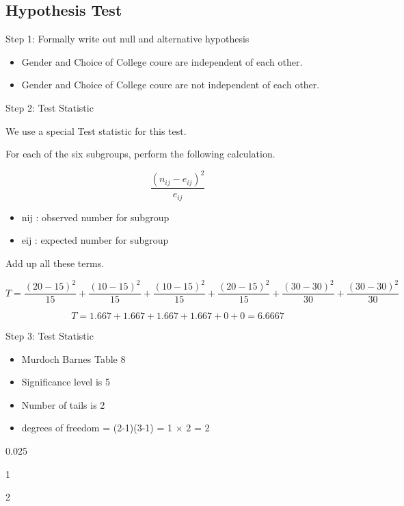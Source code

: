 \documentclass[]{report}
\begin{document}
\subsection{Hypothesis Test}

Step 1:  Formally write out null and alternative hypothesis

\begin{itemize}
	\item Gender and Choice of College coure are independent of each other.
	
	\item Gender and Choice of College coure are not independent of each other.
\end{itemize}

Step 2: Test Statistic

We use a special Test statistic for this test.

For each of the six subgroups, perform the following calculation.

\[\frac{(n_{ij}-e_{ij})^2}{e_{ij}}\]

\begin{itemize}
	\item nij : observed number for subgroup
	\item eij : expected number for subgroup
\end{itemize}


Add up all these terms.

\[T=\frac{(20-15)^2 }{15} + \frac{(10-15)^2 }{15} + \frac{(10-15)^2 }{15} + \frac{(20-15)^2 }{15} + \frac{(30-30)^2 }{30} + \frac{(30-30)^2 }{30}\]

\[
T= 1.667 + 1.667 +1.667 +1.667 +0 +0 = 6.6667 
\]



Step 3: Test Statistic

\begin{itemize}
	\item Murdoch Barnes Table 8
	\item Significance level is 5%
	\item Number of tails is 2
	\item degrees of freedom = (2-1)(3-1) = 1 $\times$ 2 = 2
\end{itemize}






0.025


1






2
\end{document}
